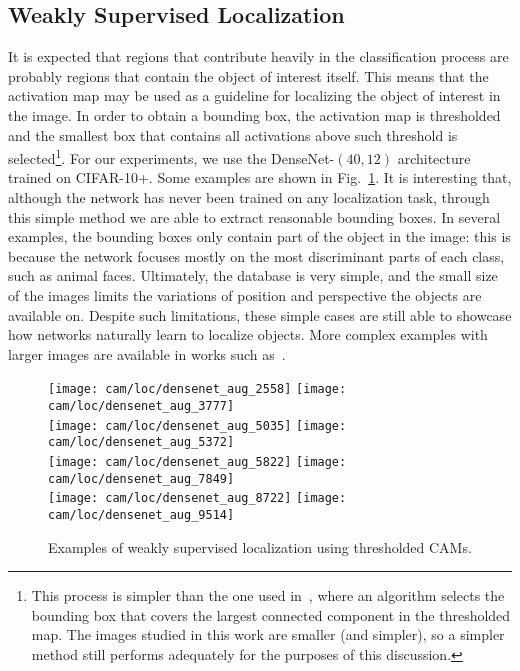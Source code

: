 \subsection{Weakly Supervised Localization}
It is expected that regions that contribute heavily in the classification process are probably regions that contain the object of interest itself. This means that the activation map may be used as a guideline for localizing the object of interest in the image. In order to obtain a bounding box, the activation map is thresholded and the smallest box that contains all activations above such threshold is selected\footnote{This process is simpler than the one used in~\cite{zhou2016learning}, where an algorithm selects the bounding box that covers the largest connected component in the thresholded map. The images studied in this work are smaller (and simpler), so a simpler method still performs adequately for the purposes of this discussion.}. For our experiments, we use the DenseNet-$(40,12)$ architecture trained on CIFAR-10+. Some examples are shown in Fig.~\ref{fig:cam-loc-densenet}. It is interesting that, although the network has never been trained on any localization task, through this simple method we are able to extract reasonable bounding boxes. In several examples, the bounding boxes only contain part of the object in the image: this is because the network focuses mostly on the most discriminant parts of each class, such as animal faces. Ultimately, the database is very simple, and the small size of the images limits the variations of position and perspective the objects are available on. Despite such limitations, these simple cases are still able to showcase how networks naturally learn to localize objects. More complex examples with larger images are available in works such as~\cite{oquab2015object,zhou2015object,zhou2016learning}.

\begin{figure}
	\centering
	\texttt{[image: cam/loc/densenet\_aug\_2558]}\quad
	\texttt{[image: cam/loc/densenet\_aug\_3777]}\\
	\texttt{[image: cam/loc/densenet\_aug\_5035]}\quad
	\texttt{[image: cam/loc/densenet\_aug\_5372]}\\
	\texttt{[image: cam/loc/densenet\_aug\_5822]}\quad
	\texttt{[image: cam/loc/densenet\_aug\_7849]}\\
	\texttt{[image: cam/loc/densenet\_aug\_8722]}\quad
	\texttt{[image: cam/loc/densenet\_aug\_9514]}
	\caption{Examples of weakly supervised localization using thresholded CAMs.\label{fig:cam-loc-densenet}}
\end{figure}

